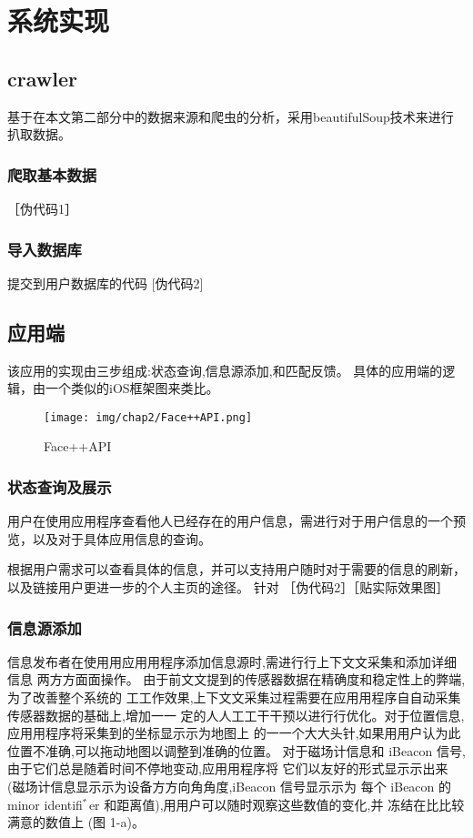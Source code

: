 
\chapter{系统实现}
\section{crawler}
基于在本文第二部分中的数据来源和爬虫的分析，采用beautifulSoup技术来进行扒取数据。
\subsection{爬取基本数据}
［伪代码1］
\subsection{导入数据库}
提交到用户数据库的代码
[伪代码2]

\section{应用端}
该应用的实现由三步组成:状态查询,信息源添加,和匹配反馈。
具体的应用端的逻辑，由一个类似的iOS框架图来类比。
\begin{figure}[h]
\begin{minipage}[t]{0.45\linewidth}
\centering
\texttt{[image: img/chap2/Face++API.png]}
\caption{Face++API\label{Face++API}}
\end{minipage}
\end{figure}

\subsection{状态查询及展示}
用户在使⽤应⽤程序查看他人已经存在的用户信息，需进行对于用户信息的一个预览，以及对于具体应用信息的查询。

根据用户需求可以查看具体的信息，并可以支持用户随时对于需要的信息的刷新，以及链接用户更进一步的个人主页的途径。
针对
［伪代码2］［贴实际效果图］
\subsection{信息源添加}
信息发布者在使⽤用应⽤用程序添加信息源时,需进⾏行上下⽂文采集和添加详细信息 两⽅方⾯面操作。
由于前⽂文提到的传感器数据在精确度和稳定性上的弊端,为了改善整个系统的 ⼯工作效果,上下⽂文采集过程需要在应⽤用程序⾃自动采集传感器数据的基础上,增加⼀一 定的⼈人⼯工⼲干预以进⾏行优化。对于位置信息,应⽤用程序将采集到的坐标显⽰示为地图上 的⼀一个⼤大头针,如果⽤用户认为此位置不准确,可以拖动地图以调整到准确的位置。 对于磁场计信息和 iBeacon 信号,由于它们总是随着时间不停地变动,应⽤用程序将 它们以友好的形式显⽰示出来 (磁场计信息显⽰示为设备⽅方向⾓角度,iBeacon 信号显⽰示为 每个 iBeacon 的 minor identiﬁﾞer 和距离值),⽤用户可以随时观察这些数值的变化,并 冻结在⽐比较满意的数值上 (图 1-a)。


